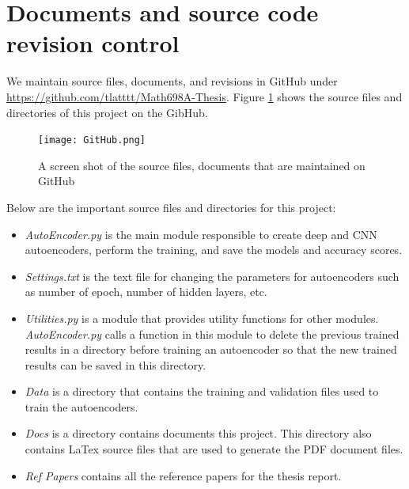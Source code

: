\documentclass{article}
\begin{document}
\section{Documents and source code revision control}
We maintain source files, documents, and revisions in GitHub under \\ \href{https://github.com/tlatttt/Math698A-Thesis}{https://github.com/tlatttt/Math698A-Thesis}. Figure \ref{fig:GitHub} shows the source files and directories of this project on the GibHub. 
\begin{figure}[h!]
	\centering
	\texttt{[image: GitHub.png]}
	\caption{A screen shot of the source files, documents that are maintained on GitHub}
	\label{fig:GitHub}
\end{figure}
Below are the important source files and directories for this project:
\begin{itemize}
	\item  \textit{AutoEncoder.py} is the main module responsible to create deep and CNN autoencoders, perform the training, and save the models and accuracy scores.
	\item \textit{Settings.txt} is the text file for changing the parameters for autoencoders such as number of epoch, number of hidden layers, etc.
	\item \textit{Utilities.py} is a module that provides utility functions for other modules. \textit{AutoEncoder.py} calls a function in this module to delete the previous trained results in a directory before training an autoencoder so that the new trained results can be saved in this directory.
	\item \textit{Data} is a directory that contains the training and validation files used to train the autoencoders.
	\item \textit{Docs} is a directory contains documents  this project. This directory also contains LaTex source files that are used to generate the PDF document files.
	\item \textit{Ref Papers} contains all the reference papers for the thesis report.	
\end{itemize}
\pagebreak
\end{document}
